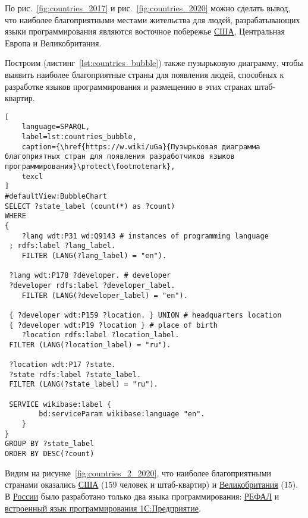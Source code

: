 \begin{marginfigure}
{
\setlength{\fboxsep}{0pt}%
\setlength{\fboxrule}{1pt}%
}
  \caption{Наиболее благоприятные страны для появления людей, способных к разработке языков программирования на 2020 год. Ссылка на SPARQL-запрос: \href{https://w.wiki/uGa}{https://w.wiki/uGa}}%
  \label{fig:countries_2_2020}%
\end{marginfigure}
По  рис.~\ref{fig:countries_2017} и рис.~\ref{fig:countries_2020} можно сделать вывод, что наиболее благоприятными местами жительства для людей, разрабатывающих языки программирования являются восточное побережье \href{https://en.wikipedia.org/wiki/USA}{США}, Центральная Европа и Великобритания.

Построим (листинг~\ref{lst:countries_bubble}) также пузырьковую диаграмму, чтобы выявить наиболее благоприятные страны для появления людей, способных к разработке языков программирования и размещению в этих странах штаб-квартир. 
\begin{lstlisting}[
	language=SPARQL,
	label=lst:countries_bubble,
	caption={\href{https://w.wiki/uGa}{Пузырьковая диаграмма благоприятных стран для появления разработчиков языков программирования}\protect\footnotemark},
	texcl
]
#defaultView:BubbleChart
SELECT ?state_label (count(*) as ?count)
WHERE
{
 	?lang wdt:P31 wd:Q9143 # instances of programming language
 ; rdfs:label ?lang_label. 
 	FILTER (LANG(?lang_label) = "en"). 
 
 ?lang wdt:P178 ?developer. # developer
 ?developer rdfs:label ?developer_label. 
 	FILTER (LANG(?developer_label) = "en"). 
 		
 { ?developer wdt:P159 ?location. } UNION # headquarters location
 { ?developer wdt:P19 ?location } # place of birth
 	?location rdfs:label ?location_label. 
 FILTER (LANG(?location_label) = "ru").
 
 ?location wdt:P17 ?state.
 ?state rdfs:label ?state_label. 
 FILTER (LANG(?state_label) = "ru").

 SERVICE wikibase:label {
		bd:serviceParam wikibase:language "en".
	} 	
}
GROUP BY ?state_label
ORDER BY DESC(?count)
\end{lstlisting}

Видим на рисунке~\ref{fig:countries_2_2020}, что наиболее благоприятными странами оказались \href{https://en.wikipedia.org/wiki/USA}{США} (159 человек и штаб-квартир) и \href{https://ru.wikipedia.org/wiki/Великобритания}{Великобритания} (15). В \href{https://en.wikipedia.org/wiki/Russia}{России} было разработано только два языка программирования: \href{https://www.wikidata.org/wiki/Q2626418}{РЕФАЛ} и \href{https://www.wikidata.org/wiki/Q65065977}{встроенный язык программирования 1С:Предприятие}.

